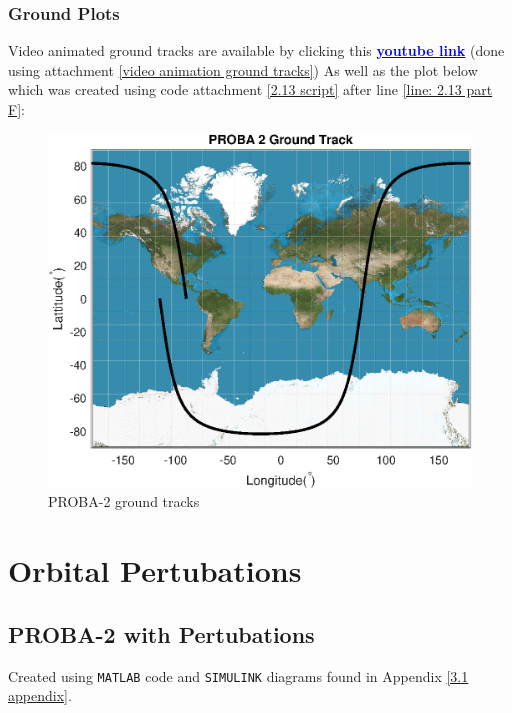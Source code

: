 \documentclass[hidelinks, 12pt]{article}%
\begin{document}
\subsubsection{Ground Plots}

Video animated ground tracks are available by clicking this \href{https://youtu.be/-6w7wiyfnvI}{\textbf{\textcolor{blue}{youtube link}}} (done using attachment \ref{video animation ground tracks}) As well as the plot below which was created using code attachment \ref{2.13 script} after line \ref{line: 2.13 part F}:
\begin{figure}[H]
    \begin{centering}
        \includegraphics[width=\textwidth]{output_files/2.13/ground_tracks.eps}
        \caption{PROBA-2 ground tracks}
        \label{ground tracks 2.13}
    \end{centering}
\end{figure}



\section{Orbital Pertubations}
\subsection{PROBA-2 with Pertubations}
\label{question 3.1}
Created using \texttt{MATLAB} code and \texttt{SIMULINK} diagrams found in Appendix \ref{3.1 appendix}.
\end{document}
